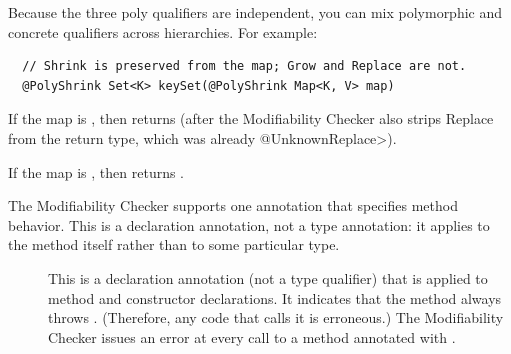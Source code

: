 \noindent
Because the three poly qualifiers are independent, you can mix
polymorphic and concrete qualifiers across hierarchies.  For example:

\begin{Verbatim}
  // Shrink is preserved from the map; Grow and Replace are not.
  @PolyShrink Set<K> keySet(@PolyShrink Map<K, V> map)
\end{Verbatim}

If the map is , then
 returns 
(after the Modifiability Checker also strips Replace from the 
return type, which was already \<@UnknownReplace>).

If the map is , then
 returns .



The Modifiability Checker supports one annotation that specifies method
behavior.  This is a declaration annotation, not a type annotation: it
applies to the method itself rather than to some particular type.

\begin{description}

\item[]
This is a declaration annotation (not a type qualifier) that is applied to
method and constructor declarations.  It indicates that the method always throws
.  (Therefore, any code that calls it is
erroneous.)  The Modifiability Checker issues an error at every call to a
method annotated with .

\end{description}




